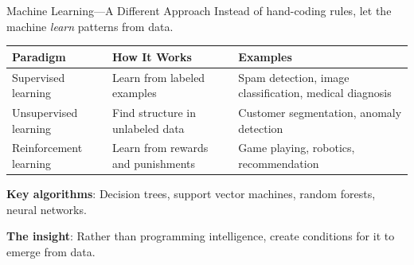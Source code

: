 ﻿\documentclass[aspectratio=169,11pt]{beamer}
\begin{document}
\begin{frame}{Machine Learning---A Different Approach}
Instead of hand-coding rules, let the machine \emph{learn} patterns from data.

\vspace{0.2em}
\begin{table}[h]
\centering
\scriptsize
\begin{tabular}{@{}p{2.8cm}p{4.5cm}p{5cm}@{}}
\toprule
\textbf{Paradigm} & \textbf{How It Works} & \textbf{Examples} \\
\midrule
Supervised learning & Learn from labeled examples & Spam detection, image classification, medical diagnosis \\
\addlinespace
Unsupervised learning & Find structure in unlabeled data & Customer segmentation, anomaly detection \\
\addlinespace
Reinforcement learning & Learn from rewards and punishments & Game playing, robotics, recommendation \\
\bottomrule
\end{tabular}
\end{table}

\vspace{0.2em}
\textbf{Key algorithms}: Decision trees, support vector machines, random forests, neural networks.

\vspace{0.2em}
\textbf{The insight}: Rather than programming intelligence, create conditions for it to emerge from data.
\end{frame}
\end{document}
